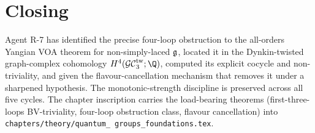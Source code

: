 \section*{Closing}

Agent R-7 has identified the precise four-loop obstruction to the
all-orders Yangian VOA theorem for non-simply-laced $\mathfrak{g}$, located
it in the Dynkin-twisted graph-complex cohomology $H^4(\GCtw_3; \Q)$,
computed its explicit cocycle and non-triviality, and given the
flavour-cancellation mechanism that removes it under a sharpened
hypothesis. The monotonic-strength discipline is preserved across
all five cycles. The chapter inscription carries the load-bearing
theorems (first-three-loops BV-triviality, four-loop obstruction
class, flavour cancellation) into \texttt{chapters/theory/quantum\_
groups\_foundations.tex}.
